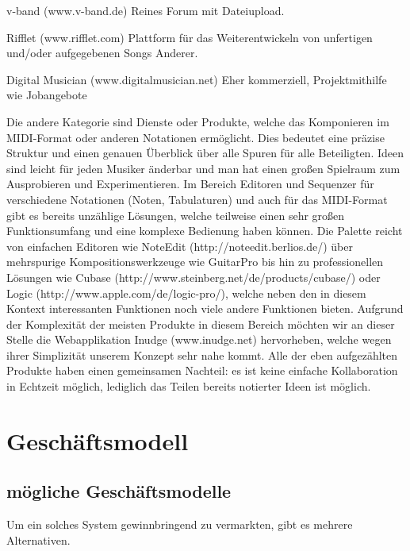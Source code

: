 \documentclass[12pt]{scrartcl}
\begin{document}
v-band (www.v-band.de)
Reines Forum mit Dateiupload.

Rifflet (www.rifflet.com)
Plattform für das Weiterentwickeln von unfertigen und/oder aufgegebenen Songs Anderer.


Digital Musician (www.digitalmusician.net)
Eher kommerziell, Projektmithilfe wie Jobangebote


Die andere Kategorie sind Dienste oder Produkte, welche das Komponieren im MIDI-Format oder anderen Notationen ermöglicht. Dies bedeutet eine präzise Struktur und einen genauen Überblick über alle Spuren für alle Beteiligten. Ideen sind leicht für jeden Musiker änderbar und man hat einen großen Spielraum zum Ausprobieren und Experimentieren.
Im Bereich Editoren und Sequenzer für verschiedene Notationen (Noten, Tabulaturen) und auch für das MIDI-Format gibt es bereits unzählige Lösungen, welche teilweise einen sehr großen Funktionsumfang und eine komplexe Bedienung haben können. Die Palette reicht von einfachen Editoren wie NoteEdit (http://noteedit.berlios.de/) über mehrspurige Kompositionswerkzeuge wie GuitarPro bis hin zu professionellen Lösungen wie Cubase (http://www.steinberg.net/de/products/cubase/) oder Logic (http://www.apple.com/de/logic-pro/), welche neben den in diesem Kontext interessanten Funktionen noch viele andere Funktionen bieten. Aufgrund der Komplexität der meisten Produkte in diesem Bereich möchten wir an dieser Stelle die Webapplikation Inudge (www.inudge.net) hervorheben, welche wegen ihrer Simplizität unserem Konzept sehr nahe kommt.
Alle der eben aufgezählten Produkte haben einen gemeinsamen Nachteil: es ist keine einfache Kollaboration in Echtzeit möglich, lediglich das Teilen bereits notierter Ideen ist möglich.




\section{Geschäftsmodell}


\subsection{mögliche Geschäftsmodelle}

Um ein solches System gewinnbringend zu vermarkten, gibt es mehrere Alternativen.
\end{document}
